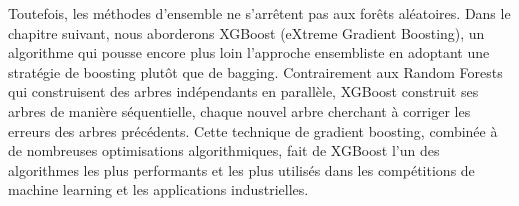 Toutefois, les méthodes d'ensemble ne s'arrêtent pas aux forêts aléatoires. Dans le chapitre suivant, nous aborderons XGBoost (eXtreme Gradient Boosting), un algorithme qui pousse encore plus loin l'approche ensembliste en adoptant une stratégie de boosting plutôt que de bagging. Contrairement aux Random Forests qui construisent des arbres indépendants en parallèle, XGBoost construit ses arbres de manière séquentielle, chaque nouvel arbre cherchant à corriger les erreurs des arbres précédents. Cette technique de gradient boosting, combinée à de nombreuses optimisations algorithmiques, fait de XGBoost l'un des algorithmes les plus performants et les plus utilisés dans les compétitions de machine learning et les applications industrielles.
